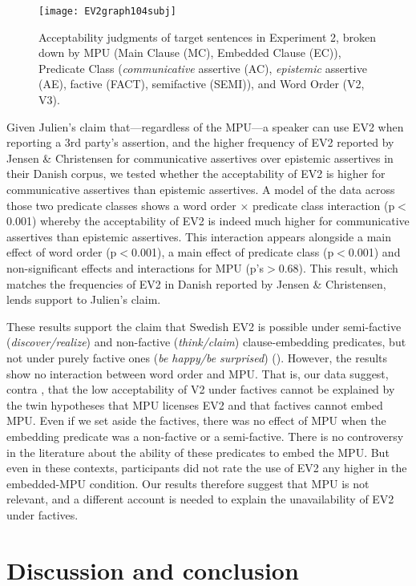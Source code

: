 \documentclass[output=paper]{LSP/langsci}
\begin{document}
\begin{figure}[H]
\centering
\texttt{[image: EV2graph104subj]}
\caption{{Acceptability judgments of target sentences in Experiment 2, broken down by MPU (Main Clause (MC), Embedded Clause (EC)),  Predicate Class (\textit{communicative} assertive (AC), \textit{epistemic} assertive (AE), factive (FACT), semifactive (SEMI)), and Word Order (V2, V3).}}
\label{fig:ev2:swedishStudy}
\end{figure}


Given Julien's claim that---regardless of the MPU---a speaker can use EV2 when reporting a 3rd party's assertion, and the higher frequency of EV2  reported by Jensen \& Christensen for communicative assertives over epistemic assertives in their Danish corpus, we tested whether the acceptability of EV2 is higher for communicative assertives than epistemic assertives. A model of the data across those two predicate classes shows a word order $\times$ predicate class interaction (p$<$0.001) whereby the acceptability of EV2 is indeed much higher for communicative assertives than epistemic assertives.  This interaction appears alongside a main effect of word order (p$<$0.001), a main effect of predicate class (p$<$0.001) and non-significant effects and interactions for MPU (p's$>$0.68). This result, which matches the frequencies of EV2 in Danish reported by Jensen \& Christensen, lends support to Julien's claim.


These results support the claim that Swedish EV2 is possible under semi-factive (\textit{discover/realize}) and non-factive (\textit{think/claim}) clause-embedding predicates, but not under purely factive ones (\textit{be happy/be surprised}) (\citealt{wiklund-etal09}).    However, the results show no interaction between word order and MPU. That is, our data suggest, contra \cite{jensen-christensen13}, that the low acceptability of V2 under factives cannot be explained by the twin hypotheses that MPU licenses EV2 and that factives cannot embed MPU.  Even if we set aside the factives, there was no effect of MPU when the embedding predicate was a non-factive or a semi-factive. There is no controversy in the literature about the ability of these predicates to embed the MPU. But even in these contexts, participants did not rate the use of EV2 any higher in the embedded-MPU condition.  Our results therefore suggest that MPU is not relevant, and a different account is needed to explain the unavailability of EV2 under factives.

\section{Discussion and conclusion}
\end{document}
